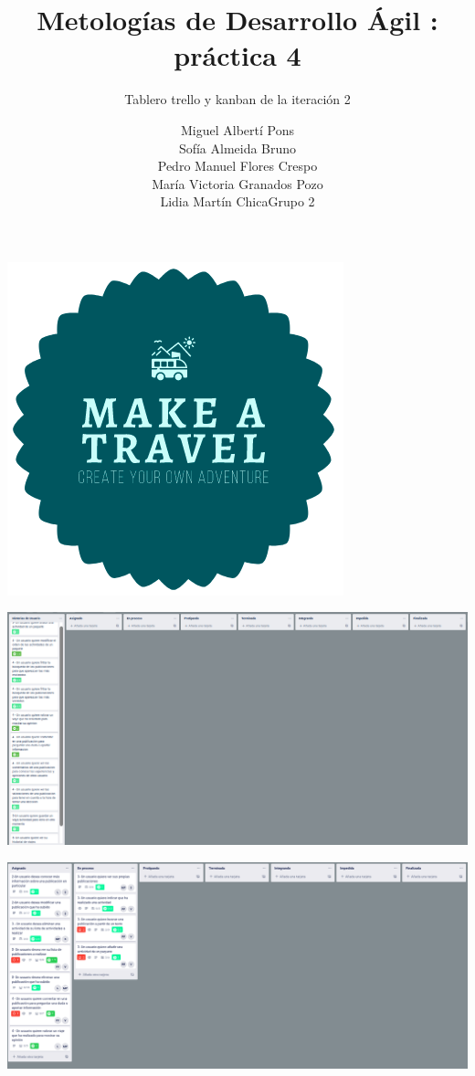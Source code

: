 \documentclass[spanish]{beamer}
\title{Metologías de Desarrollo Ágil : práctica 4}
\subtitle{Tablero trello y kanban de la iteración 2}
\author{Miguel Albertí Pons\\ Sofía Almeida Bruno\\ Pedro Manuel Flores Crespo\\ María Victoria Granados Pozo\\ Lidia Martín Chica\vspace{1em}Grupo 2}
\begin{document}
\maketitle

\begin{frame}
\centering
\begin{center}
		\includegraphics[scale=0.4]{../../Imagenes/Logo}
	\end{center}
\end{frame}

\begin{frame}
\centering
	\begin{center}
		\includegraphics[scale=0.25]{trello2_1}
	\end{center}
\end{frame}


\begin{frame}
	\begin{center}
		\includegraphics[scale=0.25]{trello2_2}
	\end{center}
\end{frame}
\end{document}
